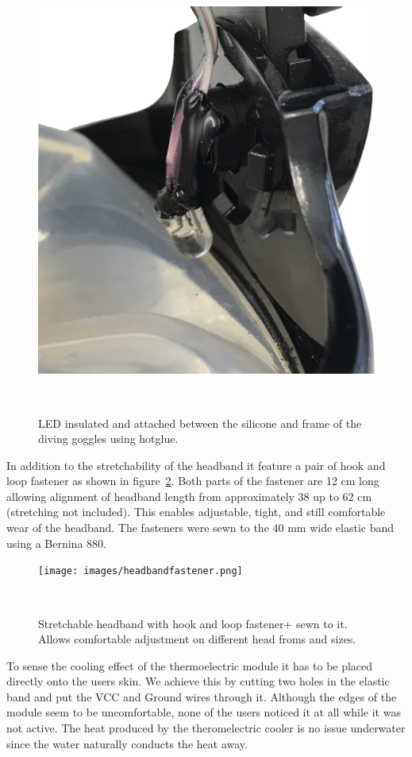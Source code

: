 \begin{figure}
	\includegraphics[width= \textwidth]{images/LEDcloseupcut.png}
	\caption{LED insulated and attached between the silicone and frame of the diving goggles using hotglue. }~\label{fig:ledcloseup}
\end{figure}

In addition to the stretchability of the headband it feature a pair of hook and loop fastener as shown in figure~\ref{fig:headbandfastener}.
Both parts of the fastener are 12 cm long allowing alignment of headband length from approximately 38 up to 62 cm (stretching not included).
This enables adjustable, tight, and still comfortable wear of the headband.
The fasteners were sewn to the 40 mm wide elastic band using a Bernina 880.

\begin{figure}
	\texttt{[image: images/headbandfastener.png]}
	\caption{Stretchable headband with hook and loop fastener+ sewn to it. Allows comfortable adjustment on different head froms and sizes.}~\label{fig:headbandfastener}
\end{figure}

To sense the cooling effect of the thermoelectric module it has to be placed directly onto the users skin.
We achieve this by cutting two holes in the elastic band and put the VCC and Ground wires through it. 
Although the edges of the module seem to be uncomfortable, none of the users noticed it at all while it was not active.
The heat produced by the theromelectric cooler is no issue underwater since the water naturally conducts the heat away.

